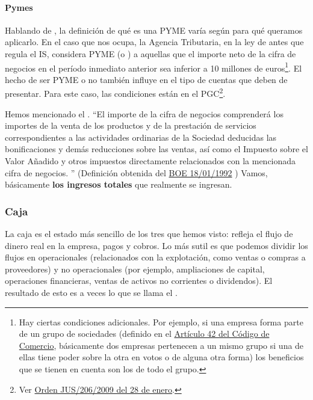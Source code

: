 \documentclass[nochap,palatino,shortheader]{apuntes}
\newcommand{\study}[1]{#1} \newcommand{\substudy}[1]{#1}
\begin{document}
\paragraph{Pymes} Hablando de , la definición de qué es una PYME varía según para qué queramos aplicarlo. 
En el caso que nos ocupa, la Agencia Tributaria, en la ley de antes que regula el IS, considera PYME (o ) a aquellas que el importe neto de la cifra de negocios en el período inmediato anterior sea inferior a 10 millones de euros\footnote{Hay ciertas condiciones adicionales. 
Por ejemplo, si una empresa forma parte de un grupo de sociedades (definido en el \href{https://www.boe.es/buscar/act.php?id=BOE-A-1885-6627&tn=1&vd=&p=20150721}{Artículo 42 del Código de Comercio}, básicamente dos empresas pertenecen a un mismo grupo si una de ellas tiene poder sobre la otra en votos o de alguna otra forma) los beneficios que se tienen en cuenta son los de todo el grupo.}. 
El hecho de ser PYME o no también influye en el tipo de cuentas que deben de presentar. Para este caso, las condiciones están en el PGC\footnote{Ver \href{https://www.boe.es/boe/dias/2009/02/10/pdfs/BOE-A-2009-2276.pdf}{Orden JUS/206/2009 del 28 de enero}.}.



Hemos mencionado el . ``El importe de \study{la cifra de negocios} comprenderá los importes de la venta de los productos y de la prestación de servicios correspondientes a las actividades ordinarias de la Sociedad deducidas las bonificaciones y demás reducciones sobre las ventas, así como el Impuesto sobre el Valor Añadido y otros impuestos directamente relacionados con la mencionada cifra de negocios.  '' (Definición obtenida del \href{http://www.minhap.gob.es/Documentacion/Publico/NormativaDoctrina/Contabilidad%20y%20Auditoria%20de%20Empresas/Contabilidad/cifranegocA.pdf}{BOE 18/01/1992}
) Vamos, básicamente \textbf{\study{los ingresos totales}} que realmente se ingresan.

\subsubsection{Caja}

La caja es el estado más sencillo de los tres que hemos visto: refleja el flujo de dinero real en la empresa, pagos y cobros. Lo más sutil es que podemos dividir los flujos en operacionales (relacionados con la explotación, como ventas o compras a proveedores) y no operacionales (por ejemplo, ampliaciones de capital, operaciones financieras, ventas de activos no corrientes o dividendos). 
El resultado de esto es a veces lo que se llama el .
\end{document}
